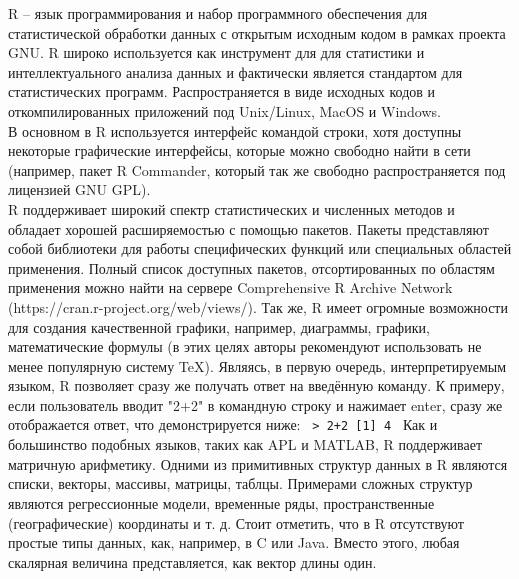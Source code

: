 R – язык программирования и набор программного обеспечения для статистической обработки 
данных с открытым исходным кодом в рамках проекта GNU. R широко используется как 
инструмент для для статистики и интеллектуального анализа данных и фактически является стандартом
для статистических программ. Распространяется в виде исходных кодов и откомпилированных
приложений под Unix/Linux, MacOS и Windows. \\
В основном в R используется интерфейс командой строки, хотя доступны некоторые графические
интерфейсы, которые можно свободно найти в сети (например, пакет R Commander, который так
же свободно распространяется под лицензией GNU GPL). \\ 
R поддерживает широкий спектр статистических и численных методов и обладает хорошей расширяемостью 
с помощью пакетов. Пакеты представляют собой библиотеки для работы специфических функций или 
специальных областей применения. Полный список доступных пакетов, отсортированных по областям 
применения можно найти на сервере Comprehensive R Archive Network (https://cran.r-project.org/web/views/). Так же, R имеет огромные 
возможности для создания качественной графики, например, диаграммы, графики, математические формулы 
(в этих целях авторы рекомендуют использовать не менее популярную систему TeX).
Являясь, в первую очередь, интерпретируемым языком, R позволяет сразу же получать ответ на введённую
команду. К примеру, если пользователь вводит "2+2" в командную строку и нажимает enter, сразу же
отображается ответ, что демонстрируется ниже:
\texttt{
    > 2+2
    [1] 4
}
Как и большинство подобных языков, таких как APL и MATLAB, R поддерживает матричную арифметику.
Одними из примитивных структур данных в R являются списки, векторы, массивы, матрицы, таблцы.
Примерами сложных структур являются регрессионные модели, временные ряды, пространственные 
(географические) координаты и т. д. Стоит отметить, что в R отсутствуют простые типы данных, как,
например, в C или Java. Вместо этого, любая скалярная величина представляется, как вектор длины один.

